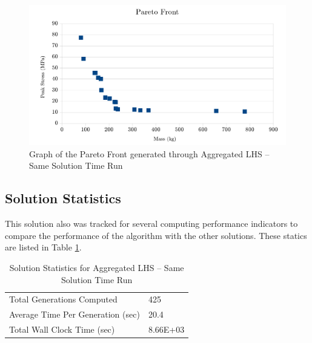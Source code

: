 \begin{figure}
\includegraphics[width=\textwidth]{img/s2i80g17_front.png}
\caption{Graph of the Pareto Front generated through Aggregated LHS -- Same Solution Time Run}
\label{fig:pfront_agg_sametime}
\end{figure}

\subsection{Solution Statistics}
This solution also was tracked for several computing performance indicators to compare the performance of the algorithm with the other solutions. These statics are listed in Table \ref{tab:stat_agg_sametime}. 

\begin{table}[!htbp]
  \centering
  \begin{tabular}{|l|l|}
    \hline
	  Total Generations Computed & 425\\
    Average Time Per Generation (sec) & 20.4\\
    Total Wall Clock Time (sec)	 & 8.66E+03\\
    \hline
  \end{tabular}
  \caption{Solution Statistics for Aggregated LHS -- Same Solution Time Run}
  \label{tab:stat_agg_sametime}
\end{table} 
